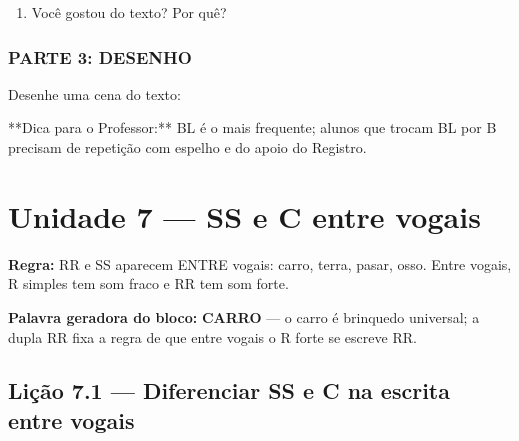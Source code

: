 \begin{exercicio}
\begin{enumerate}
  \item Você gostou do texto? Por quê?
  \begin{center}
  \underline{\hspace{12cm}}
  \end{center}

\end{enumerate}

\subsection*{PARTE 3: DESENHO}

Desenhe uma cena do texto:

\begin{center}
\end{center}

\end{exercicio}

\begin{dica}
**Dica para o Professor:** BL é o mais frequente; alunos que trocam BL por B precisam de repetição com espelho e do apoio do Registro.
\end{dica}


\chapter{Unidade 7 --- SS e C entre vogais}


\textbf{Regra:} RR e SS aparecem ENTRE vogais: carro, terra, pasar, osso. Entre vogais, R simples tem som fraco e RR tem som forte.

\textbf{Palavra geradora do bloco:} \textbf{CARRO} --- o carro é brinquedo universal; a dupla RR fixa a regra de que entre vogais o R forte se escreve RR.

\section{Lição 7.1 --- Diferenciar SS e C na escrita entre vogais}

